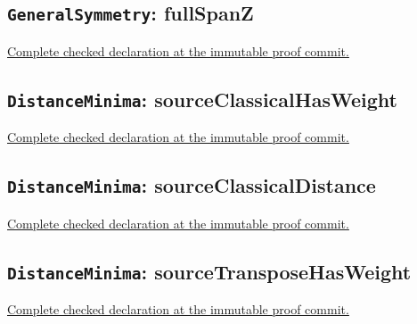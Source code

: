 

\subsection*{\texttt{GeneralSymmetry}: fullSpanZ}

\noindent\href{https://github.com/alectionary/vibe-math/blob/3ae21c0719cedbd928f4f7882f9b9e266567605e/formalization/distance-preservation/truncated12/GeneralSymmetry.lean#L24-L25}{Complete checked declaration at the immutable proof commit.}



\subsection*{\texttt{DistanceMinima}: sourceClassicalHasWeight}

\noindent\href{https://github.com/alectionary/vibe-math/blob/3ae21c0719cedbd928f4f7882f9b9e266567605e/formalization/distance-preservation/truncated12/DistanceMinima.lean#L9-L11}{Complete checked declaration at the immutable proof commit.}



\subsection*{\texttt{DistanceMinima}: sourceClassicalDistance}

\noindent\href{https://github.com/alectionary/vibe-math/blob/3ae21c0719cedbd928f4f7882f9b9e266567605e/formalization/distance-preservation/truncated12/DistanceMinima.lean#L21-L22}{Complete checked declaration at the immutable proof commit.}



\subsection*{\texttt{DistanceMinima}: sourceTransposeHasWeight}

\noindent\href{https://github.com/alectionary/vibe-math/blob/3ae21c0719cedbd928f4f7882f9b9e266567605e/formalization/distance-preservation/truncated12/DistanceMinima.lean#L33-L35}{Complete checked declaration at the immutable proof commit.}



